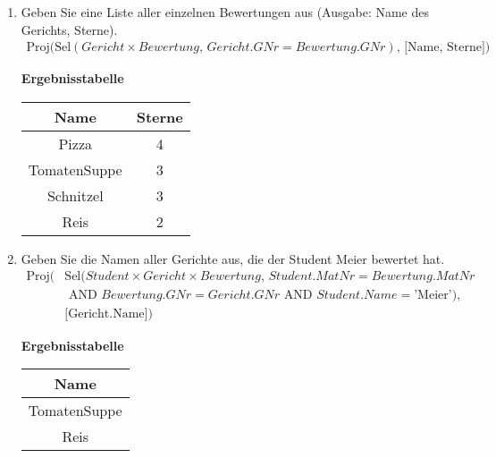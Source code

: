 \begin{enumerate}
    \item Geben Sie eine Liste aller einzelnen Bewertungen aus (Ausgabe: Name des Gerichts, Sterne).
        \begin{align*}
            \text{Proj}\bigl(
            \text{Sel}(Gericht \times Bewertung,\, Gericht.GNr = Bewertung.GNr),\, \text{[Name, Sterne]}
            \bigr)
        \end{align*}

        \begin{table}[H]
            \centering
            \textbf{Ergebnisstabelle} \\ [3pt]
            \begin{tabular}{|c|c|}
                \hline
                \textbf{Name} & \textbf{Sterne}\\
                \hline
                Pizza & 4 \\
                TomatenSuppe & 3 \\
                Schnitzel & 3 \\
                Reis & 2 \\
                \hline  
            \end{tabular}
        \end{table}

    \item Geben Sie die Namen aller Gerichte aus, die der Student Meier bewertet hat.
        \begin{align*}
            \text{Proj}\bigl(&
            \text{Sel}(Student \times Gericht \times Bewertung,\, Student.MatNr = Bewertung.MatNr \\
            &\text{ AND } Bewertung.GNr = Gericht.GNr \text{ AND } Student.Name=\text{'Meier'}),\, \\
            &\text{[Gericht.Name]}
            \bigr)
        \end{align*}

        \begin{table}[H]
            \centering
            \textbf{Ergebnisstabelle} \\ [3pt]
            \begin{tabular}{|c|}
                \hline
                \textbf{Name}\\
                \hline
                TomatenSuppe \\
                Reis \\
                \hline  
            \end{tabular}
        \end{table}


\end{enumerate}
